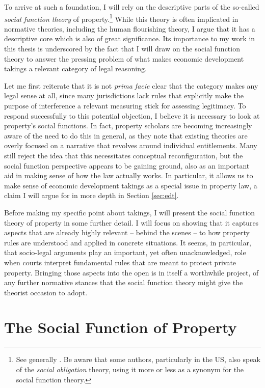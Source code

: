 To arrive at such a foundation, I will rely on the descriptive parts of the so-called {\it social function theory} of property.\footnote{See generally \cite{foster11,mirow10,alexander09a}. Be aware that some authors, particularly in the US, also speak of the {\it social obligation} theory, using it more or less as a synonym for the social function theory.} While this theory is often implicated in normative theories, including the human flourishing theory, I argue that it has a descriptive core which is also of great significance. Its importance to my work in this thesis is underscored by the fact that I will draw on the social function theory to answer the pressing problem of what makes economic development takings a relevant category of legal reasoning.

Let me first reiterate that it is not {\it prima facie} clear that the category makes any legal sense at all, since many jurisdictions lack rules that explicitly make the purpose of interference a relevant measuring stick for assessing legitimacy. To respond successfully to this potential objection, I believe it is necessary to look at property's social functions. In fact, property scholars are becoming increasingly aware of the need to do this in general, as they note that existing theories are overly focused on a narrative that revolves around individual entitlements. Many still reject the idea that this necessitates conceptual reconfiguration, but the social function perspective appears to be gaining ground, also as an important aid in making sense of how the law actually works. In particular, it allows us to make sense of economic development takings as a special issue in property law, a claim I will argue for in more depth in Section \ref{sec:edt}.

Before making my specific point about takings, I will present the social function theory of property in some further detail. I will focus on showing that it captures aspects that are already highly relevant -- behind the scenes -- to how property rules are understood and applied in concrete situations. It seems, in particular, that socio-legal arguments play an important, yet often unacknowledged, role when courts interpret fundamental rules that are meant to protect private property. Bringing those aspects into the open is in itself a worthwhile project,  of any further normative stances that the social function theory might give the theorist occasion to adopt.

\section{The Social Function of Property}\label{sec:socfunc}

